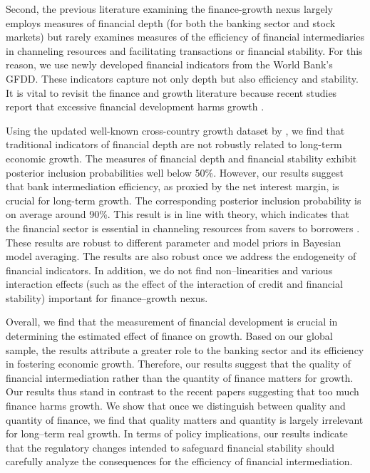 \begin{refsection}
Second, the previous literature examining the finance-growth nexus largely employs measures of financial depth (for both the banking sector and stock markets) but rarely examines measures of the efficiency of financial intermediaries in channeling resources and facilitating transactions or financial stability. For this reason, we use newly developed financial indicators from the World Bank's \ac{GFDD}. These indicators capture not only depth but also efficiency and stability. It is vital to revisit the finance and growth literature because recent studies report that excessive financial development harms growth \parencite{CecchettiKharroubi2012}.

Using the updated well-known cross-country growth dataset by \textcite{Fernandezetal2001}, we find that traditional indicators of financial depth are not robustly related to long-term economic growth. The measures of financial depth and financial stability exhibit posterior inclusion probabilities well below 50\%. However, our results suggest that bank intermediation efficiency, as proxied by the net interest margin, is crucial for long-term growth. The corresponding posterior inclusion probability is on average around 90\%. This result is in line with theory, which indicates that the financial sector is essential in channeling resources from savers to borrowers \textcite{Pagano1993}. These results are robust to different parameter and model priors in Bayesian model averaging. The results are also robust once we address the endogeneity of financial indicators. In addition, we do not find non--linearities and various interaction effects (such as the effect of the interaction of credit and financial stability) important for finance--growth nexus. 

Overall, we find that the measurement of financial development is crucial in determining the estimated effect of finance on growth. Based on our global sample, the results attribute a greater role to the banking sector and its efficiency in fostering economic growth. Therefore, our results suggest that the quality of financial intermediation rather than the quantity of finance matters for growth. Our results thus stand in contrast to the recent papers suggesting that too much finance harms growth. We show that once we distinguish between quality and quantity of finance, we find that quality matters and quantity is largely irrelevant for long--term real growth. In terms of policy implications, our results indicate that the regulatory changes intended to safeguard financial stability should carefully analyze the consequences for the efficiency of financial intermediation.


\end{refsection}
